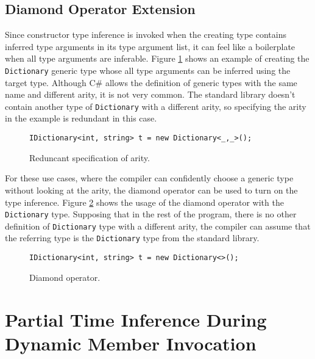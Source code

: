 \subsection{Diamond Operator Extension} \label{sect13:ex2}

Since constructor type inference is invoked when the creating type contains inferred type arguments in its type argument list, it can feel like a boilerplate when all type arguments are inferable. 
Figure \ref{img57:diamondExample} shows an example of creating the \texttt{Dictionary} generic type whose all type arguments can be inferred using the target type. 
Although C\# allows the definition of generic types with the same name and different arity, it is not very common. 
The standard library doesn’t contain another type of \texttt{Dictionary} with a different arity, so specifying the arity in the example is redundant in this case.
\begin{figure}[h!]
\begin{lstlisting}[style=csharp, mathescape=true]
IDictionary<int, string> t = new Dictionary<_,_>();
\end{lstlisting}
\caption{Reduncant specification of arity.}
\label{img57:diamondExample}
\end{figure}
\par
For these use cases, where the compiler can confidently choose a generic type without looking at the arity, the diamond operator can be used to turn on the type inference. 
Figure \ref{img58:diamondExample2} shows the usage of the diamond operator with the \texttt{Dictionary} type. 
Supposing that in the rest of the program, there is no other definition of \texttt{Dictionary} type with a different arity, the compiler can assume that the referring type is the \texttt{Dictionary} type from the standard library.
\begin{figure}[h!]
\begin{lstlisting}[style=csharp, mathescape=true]
IDictionary<int, string> t = new Dictionary<>();
\end{lstlisting}
\caption{Diamond operator.}
\label{img58:diamondExample2}
\end{figure}

\section{Partial Time Inference During Dynamic Member Invocation} \label{sect11:dynamic}

